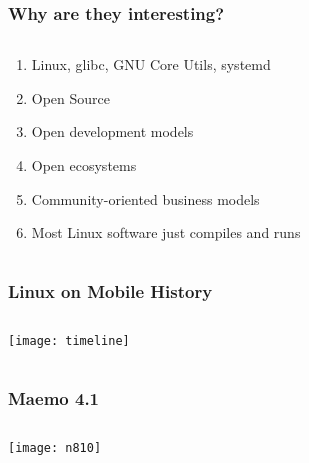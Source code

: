 \documentclass[
	notes=none,
	aspectratio=169
]{beamer}
\begin{document}

\begin{frame}
\frametitle{Why are they interesting?}

\begin{columns}[T]
\begin{column}[T]{1.0\textwidth}
\setlength{\parskip}{0.5em}

\vspace{0.4cm}
\begin{enumerate}
\setlength{\parskip}{0.5em}
\item Linux, glibc, GNU Core Utils, systemd
\item Open Source
\item Open development models
\item Open ecosystems
\item Community-oriented business models
\item Most Linux software just compiles and runs
\end{enumerate}

\end{column}
\end{columns}

\end{frame}
\note{
}


\begin{frame}
\frametitle{Linux on Mobile History}

\begin{columns}[T]
\begin{column}[T]{1.1\textwidth}

\vspace{0.5cm}
\texttt{[image: timeline]}

\end{column}
\end{columns}

\end{frame}
\note{
}


\begin{frame}
\frametitle{Maemo 4.1}

\begin{columns}[T]
\begin{column}[T]{1.0\textwidth}

\vspace{0.5cm}
\begin{center}
\texttt{[image: n810]}
\end{center}

\end{column}
\end{columns}

\end{frame}
\note{
}
\end{document}
